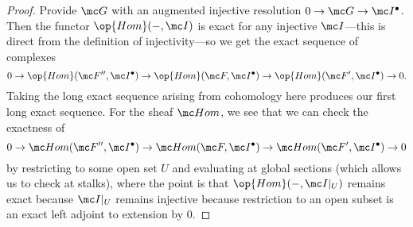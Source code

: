 \documentclass[../notes.tex]{subfiles}
\begin{document}
\begin{proof}
	Provide $\mc G$ with an augmented injective resolution $0\to\mc G\to\mc I^\bullet$. Then the functor $\op{Hom}(-,\mc I)$ is exact for any injective $\mc I$---this is direct from the definition of injectivity---so we get the exact sequence of complexes
	\[0\to\op{Hom}(\mc F'',\mc I^\bullet)\to\op{Hom}(\mc F,\mc I^\bullet)\to\op{Hom}(\mc F',\mc I^\bullet)\to0.\]
	Taking the long exact sequence arising from cohomology here produces our first long exact sequence. For the sheaf $\mc Hom$, we see that we can check the exactness of
	\[0\to\mc Hom(\mc F'',\mc I^\bullet)\to\mc Hom(\mc F,\mc I^\bullet)\to\mc Hom(\mc F',\mc I^\bullet)\to0\]
	by restricting to some open set $U$ and evaluating at global sections (which allows us to check at stalks), where the point is that $\op{Hom}(-,\mc I|_U)$ remains exact because $\mc I|_U$ remains injective because restriction to an open subset is an exact left adjoint to extension by $0$.
\end{proof}
\end{document}
